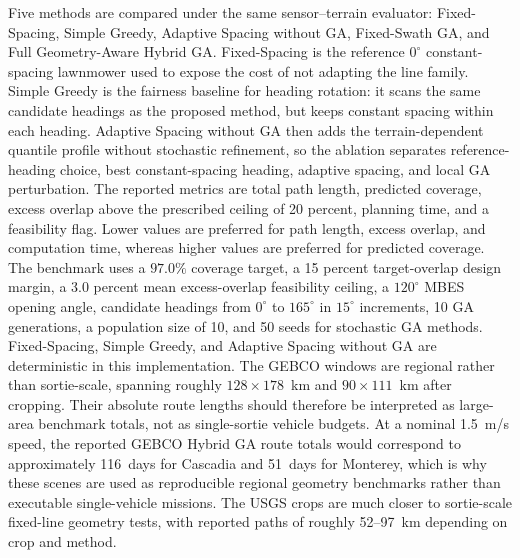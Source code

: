 \documentclass[jmse,article,submit,moreauthors]{Definitions/mdpi}
\begin{document}
Five methods are compared under the same sensor--terrain evaluator: Fixed-Spacing, Simple Greedy, Adaptive Spacing without GA, Fixed-Swath GA, and Full Geometry-Aware Hybrid GA. Fixed-Spacing is the reference \(0^{\circ}\) constant-spacing lawnmower used to expose the cost of not adapting the line family. Simple Greedy is the fairness baseline for heading rotation: it scans the same candidate headings as the proposed method, but keeps constant spacing within each heading. Adaptive Spacing without GA then adds the terrain-dependent quantile profile without stochastic refinement, so the ablation separates reference-heading choice, best constant-spacing heading, adaptive spacing, and local GA perturbation. The reported metrics are total path length, predicted coverage, excess overlap above the prescribed ceiling of 20 percent, planning time, and a feasibility flag. Lower values are preferred for path length, excess overlap, and computation time, whereas higher values are preferred for predicted coverage. The benchmark uses a $97.0\%$ coverage target, a 15 percent target-overlap design margin, a 3.0 percent mean excess-overlap feasibility ceiling, a $120^{\circ}$ MBES opening angle, candidate headings from $0^{\circ}$ to $165^{\circ}$ in $15^{\circ}$ increments, 10 GA generations, a population size of 10, and 50 seeds for stochastic GA methods. Fixed-Spacing, Simple Greedy, and Adaptive Spacing without GA are deterministic in this implementation. The GEBCO windows are regional rather than sortie-scale, spanning roughly $128 \times 178$~km and $90 \times 111$~km after cropping. Their absolute route lengths should therefore be interpreted as large-area benchmark totals, not as single-sortie vehicle budgets. At a nominal 1.5~m/s speed, the reported GEBCO Hybrid GA route totals would correspond to approximately 116~days for Cascadia and 51~days for Monterey, which is why these scenes are used as reproducible regional geometry benchmarks rather than executable single-vehicle missions. The USGS crops are much closer to sortie-scale fixed-line geometry tests, with reported paths of roughly 52--97~km depending on crop and method.
\end{document}
